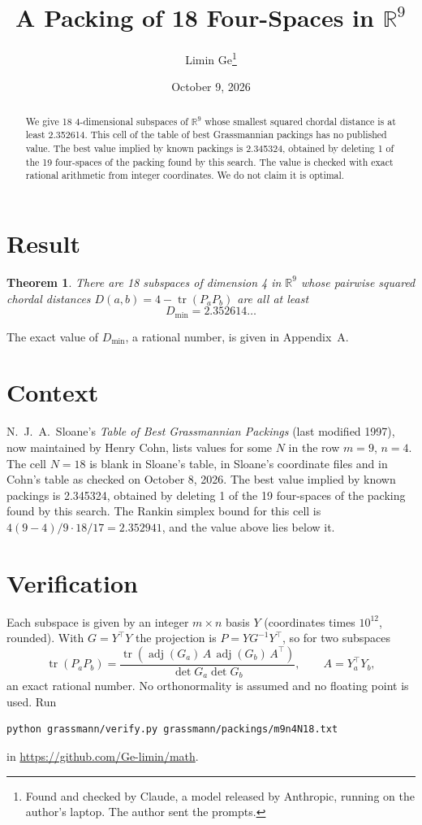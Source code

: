 \documentclass[11pt,a4paper]{article}
\title{A Packing of 18 Four-Spaces in $\mathbb{R}^{9}$}
\author{Limin Ge\thanks{Found and checked by Claude, a model released by Anthropic, running on the author's laptop. The author sent the prompts.}}
\date{October 9, 2026}
\newtheorem*{theorem}{Theorem}
\begin{document}
\maketitle
\begin{abstract}
We give 18 4-dimensional subspaces of $\mathbb{R}^{9}$ whose smallest squared chordal distance is at least 2.352614. This cell of the table of best Grassmannian packings has no published value. The best value implied by known packings is 2.345324, obtained by deleting 1 of the 19 four-spaces of the packing found by this search. The value is checked with exact rational arithmetic from integer coordinates. We do not claim it is optimal.
\end{abstract}

\section{Result}
\begin{theorem}
There are 18 subspaces of dimension 4 in $\mathbb{R}^{9}$ whose pairwise squared chordal distances $D(a,b) = 4 - \operatorname{tr}(P_aP_b)$ are all at least
\[ D_{\min} = 2.352614\ldots \]
\end{theorem}
The exact value of $D_{\min}$, a rational number, is given in Appendix~A.


\section{Context}
N.~J.~A.~Sloane's \emph{Table of Best Grassmannian Packings} (last modified 1997), now maintained by Henry Cohn, lists values for some $N$ in the row $m=9$, $n=4$. The cell $N=18$ is blank in Sloane's table, in Sloane's coordinate files and in Cohn's table as checked on October 8, 2026. The best value implied by known packings is 2.345324, obtained by deleting 1 of the 19 four-spaces of the packing found by this search. The Rankin simplex bound for this cell is $4(9-4)/9\cdot 18/17 = 2.352941$, and the value above lies below it.


\section{Verification}
Each subspace is given by an integer $m\times n$ basis $Y$ (coordinates times $10^{12}$, rounded). With $G=Y^\top Y$ the projection is $P=YG^{-1}Y^\top$, so for two subspaces
\[ \operatorname{tr}(P_aP_b)=\frac{\operatorname{tr}(\operatorname{adj}(G_a)\,A\,\operatorname{adj}(G_b)\,A^\top)}{\det G_a\det G_b},\qquad A=Y_a^\top Y_b, \]
an exact rational number. No orthonormality is assumed and no floating point is used. Run
\begin{verbatim}
python grassmann/verify.py grassmann/packings/m9n4N18.txt
\end{verbatim}
in \url{https://github.com/Ge-limin/math}.
\end{document}
